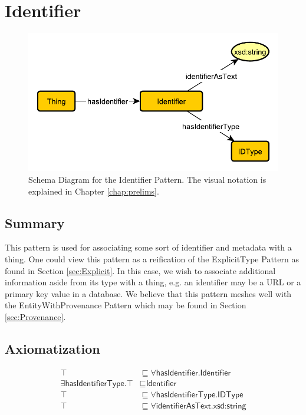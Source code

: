 \section{Identifier}
\label{sec:Identifier}
\begin{figure}[h!]
\begin{center}
\includegraphics[width=.7\textwidth]{figures/identifier}
\end{center}
\caption{Schema Diagram for the Identifier Pattern. The visual notation is explained in Chapter \ref{chap:prelims}.}
\label{fig:Identifier}
\end{figure}
\subsection{Summary}
\label{sum:Identifier}
This pattern is used for associating some sort of identifier and metadata with a thing. One could view this pattern as a reification of the \textsf{ExplicitType} Pattern as found in Section \ref{sec:Explicit}. In this case, we wish to associate additional information aside from its type with a thing, e.g. an identifier may be a URL or a primary key value in a database. We believe that this pattern meshes well with the \textsf{EntityWithProvenance} Pattern which may be found in Section \ref{sec:Provenance}.

\subsection{Axiomatization}
\label{axs:Identifier}
\begin{align}
\top &\sqsubseteq \forall \textsf{hasIdentifier.Identifier} \\
\exists \textsf{hasIdentifierType.}\top &\sqsubseteq \textsf{Identifier} \\
\top &\sqsubseteq \forall \textsf{hasIdentifierType.IDType} \\
\top &\sqsubseteq \forall \textsf{identifierAsText.xsd:string}
\end{align}

